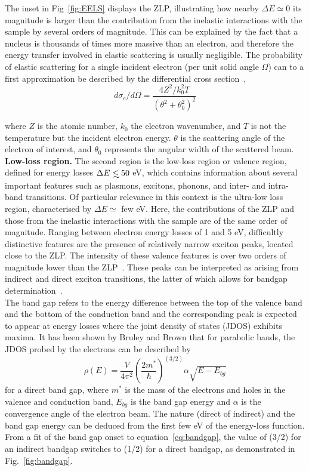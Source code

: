 The inset in Fig~\ref{fig:EELS} displays the ZLP, illustrating how nearby $\Delta E\simeq 0$
its magnitude is larger than the contribution from the inelastic interactions
with the sample by several orders of magnitude.
%
This can be explained by the fact that a nucleus is thousands of times more massive than an electron, 
and therefore the energy transfer involved in elastic scattering is usually negligible. 
%
The probability of elastic scattering for a single incident electron 
(per unit solid angle $\Omega$) can to a first approximation be described by 
the differential cross section~\cite{Egerton:1996},
\begin{equation}
    d\sigma_e / d\Omega = \frac{4Z^2/k_0^2T}{(\theta^2 + \theta_0^2)^2}
\end{equation}

where $Z$ is the atomic number, $k_0$ the electron wavenumber, 
and $T$ is not the temperature but the incident electron energy. 
$\theta$ is the scattering angle of the electron of interest, 
and $\theta_0$ represents the angular width of the scattered beam. \\

{\bf Low-loss region.} The second region is the low-loss region or valence region, defined for energy losses
$\Delta E \lsim 50$ eV, which contains information
about several important features such as plasmons, excitons, phonons, and
inter- and intra-band transitions.
%
Of particular relevance in this context is the ultra-low loss region, characterised by $\Delta E \simeq$ few eV.
Here, the contributions of the ZLP and those from the inelastic interactions
with the sample are of the same order of magnitude.
%
%
Ranging between electron energy losses of 1 and 5 eV, 
difficultly distinctive features are the presence of 
relatively narrow exciton peaks, located close to the ZLP. 
The intensity of these valence features is over two orders of magnitude lower 
than the ZLP~\cite{abajo}. These peaks can be interpreted as arising from
indirect and direct exciton transitions, the latter of which allows for
bandgap determination~\cite{stoger}.\\
The  band gap  refers  to  the  energy  difference between the top of the valence band 
and the bottom of the conduction band and the corresponding peak is expected to appear 
at energy losses where the joint density of states (JDOS) exhibits maxima. 
%
It has been shown by Bruley and Brown \cite{bruley} that for parabolic bands, 
the JDOS probed by the electrons can be described by
\begin{equation}
\label{eq:bandgap}
    \rho(E) = \frac{V}{4\pi^2} \left( \frac{2m^*}{\hbar} \right)^{(3/2)} \alpha \sqrt{E-E_{bg}}
\end{equation}
for a direct band gap, where $m^*$ is the mass of the electrons and holes in the 
valence and conduction band, $E_{bg}$ is the band gap energy and $\alpha$ is the 
convergence angle of the electron beam.
The nature (direct of indirect) and the band gap energy can be deduced 
from the first few eV of the energy-loss function. 
%
From a fit of the band gap onset to equation~\ref{eq:bandgap}, 
the value of (3/2) for an indirect bandgap switches to (1/2) for a direct bandgap,
as demonstrated in Fig.~\ref{fig:bandgap}.

